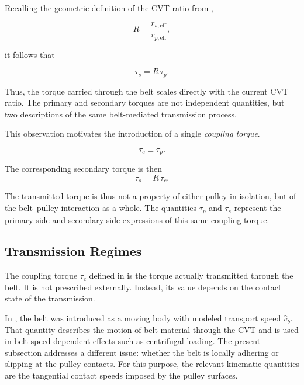 \documentclass[11pt]{article}
\numberwithin{equation}{section}
\begin{document}
Recalling the geometric definition of the CVT ratio from ,

\begin{equation}
R = \frac{r_{s,\mathrm{eff}}}{r_{p,\mathrm{eff}}},
\label{eq:R_eff_repeat}
\end{equation}

it follows that

\begin{equation}
\tau_s = R\,\tau_p.
\label{eq:torque_ratio}
\end{equation}

Thus, the torque carried through the belt scales directly with the current
CVT ratio. The primary and secondary torques are not independent quantities,
but two descriptions of the same belt-mediated transmission process.

This observation motivates the introduction of a single \emph{coupling torque}.

\begin{equation}
\tau_c \equiv \tau_p.
\end{equation}

The corresponding secondary torque is then
\begin{equation}
\tau_s = R \, \tau_c.
\end{equation}

The transmitted torque is thus not a property of either pulley in isolation, but
of the belt--pulley interaction as a whole. The quantities $\tau_p$ and $\tau_s$
represent the primary-side and secondary-side expressions of this same coupling
torque.


\subsection{Transmission Regimes}
\label{sec:transmission_regimes}

The coupling torque $\tau_c$ defined in  is the torque
actually transmitted through the belt.
It is not prescribed externally.
Instead, its value depends on the contact state of the transmission.

In , the belt was introduced as a moving body
with modeled transport speed $\hat{v}_b$.
That quantity describes the motion of belt material through the CVT and is used
in belt-speed-dependent effects such as centrifugal loading.
The present subsection addresses a different issue: whether the belt is locally
adhering or slipping at the pulley contacts.
For this purpose, the relevant kinematic quantities are the tangential contact
speeds imposed by the pulley surfaces.
\end{document}
